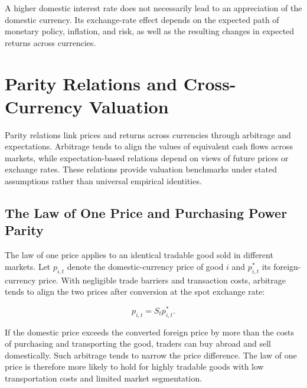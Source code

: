 \begin{tcolorbox}[
  enhanced,
  breakable,
  colback=white,
  colframe=FinanceBlue,
  boxrule=0.7pt,
  sharp corners,
  borderline west={2.2pt}{0pt}{FinanceBlue},
  title=\textbf{Financial Perspective: Interest Rates and Exchange Rates},
  coltitle=white,
  colbacktitle=FinanceBlue,
  fonttitle=\bfseries,
  before skip=1.2em,
  after skip=1.2em
]

A higher domestic interest rate does not necessarily
lead to an appreciation of the domestic currency.
Its exchange-rate effect depends on the expected
path of monetary policy, inflation, and risk, as well
as the resulting changes in expected returns across
currencies.

\end{tcolorbox}


\section{Parity Relations and Cross-Currency Valuation}

Parity relations link prices and returns across currencies through arbitrage and expectations. Arbitrage tends to align the values of equivalent cash flows across markets, while expectation-based relations depend on views of future prices or exchange rates. These relations provide valuation benchmarks under stated assumptions rather than universal empirical identities.

\subsection{The Law of One Price and Purchasing Power Parity}

The law of one price applies to an identical tradable
good sold in different markets. Let $p_{i,t}$ denote
the domestic-currency price of good $i$ and
$p_{i,t}^{*}$ its foreign-currency price. With negligible
trade barriers and transaction costs, arbitrage tends
to align the two prices after conversion at the spot
exchange rate:

\begin{equation}
p_{i,t}=S_t p_{i,t}^{*}.
\label{eq:ch10-law-of-one-price}
\end{equation}

If the domestic price exceeds the converted foreign
price by more than the costs of purchasing and
transporting the good, traders can buy abroad and
sell domestically. Such arbitrage tends to narrow
the price difference. The law of one price is therefore
more likely to hold for highly tradable goods with
low transportation costs and limited market
segmentation.

